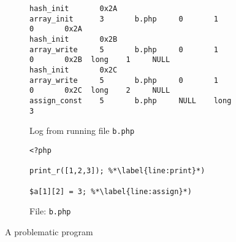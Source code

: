 \begin{figure}[ht]
\centering
\begin{subfigure}{\textwidth}
\begin{lstlisting}[mathescape, deletekeywords={array},basicstyle=\tiny]
hash_init       0x2A
array_init      3       b.php     0       1       0       0x2A
hash_init       0x2B
array_write     5       b.php     0       1       0       0x2B  long    1     NULL
hash_init       0x2C
array_write     5       b.php     0       1       0       0x2C  long    2     NULL
assign_const    5       b.php     NULL    long    3
\end{lstlisting}
\caption{Log from running file \texttt{b.php}}
\label{lst:dis_code_out}
\end{subfigure}
\begin{subfigure}{\textwidth}
\begin{lstlisting}
<?php

print_r([1,2,3]); %*\label{line:print}*)

$a[1][2] = 3; %*\label{line:assign}*)

\end{lstlisting}
\caption{File: \texttt{b.php}}
\label{lst:dis_code}
\end{subfigure}
\caption{A problematic program}
\label{lst:dis}
\end{figure}